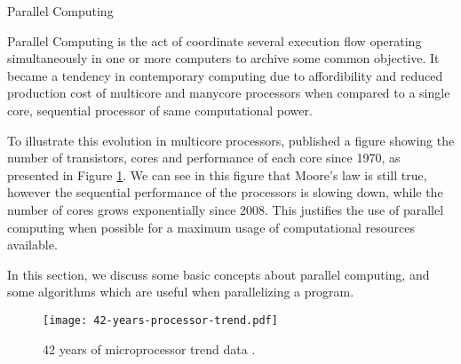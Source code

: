 \begin{section}{Parallel Computing}
\label{sec:parallel_comp}

	Parallel Computing is the act of coordinate several execution
flow operating simultaneously in one or more computers to archive
some common objective. It became a tendency in contemporary computing
due to affordibility and reduced production cost of multicore
and manycore processors when compared to a single core, sequential
processor of same computational power.


To illustrate this evolution in multicore processors, \cite{42years}
published a figure showing the number of transistors, cores and
performance of each core since 1970, as presented in Figure
\ref{fig:42years}. We can see in this figure that Moore's law
is still true, however the sequential performance of the processors
is slowing down, while the number of cores grows exponentially
since 2008. This justifies the use of parallel computing when possible
for a maximum usage of computational resources available.



In this section, we discuss some basic concepts about parallel computing,
and some algorithms which are useful when parallelizing a program.


\begin{figure}[ht]
 \centering
 \texttt{[image: 42-years-processor-trend.pdf]}
 \caption{42 years of microprocessor trend data \citep{42years}.}
 \label{fig:42years}
\end{figure}


\end{section}
